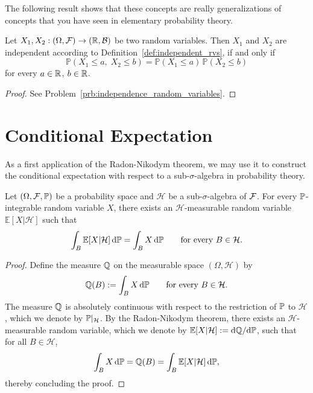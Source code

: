 The following result shows that these concepts are really generalizations of concepts that you have seen in elementary probability theory.

\begin{lemma}\label{lem:independence_random_variables}
Let $X_1, X_2: (\Omega, \mathcal F) \to (\mathbb R, \mathcal B)$ be two random variables. Then $X_1$ and $X_2$ are independent according to Definition~\ref{def:independent_rvs}, if and only if 
	\[
	\mathbb{P}( X_1 \leq a,\; X_2 \leq b ) = \mathbb{P}(X_1 \leq a)\, \mathbb{P}(X_2 \leq b)
	\]
	for every $a \in \mathbb R$, $b \in \mathbb R$.
\end{lemma}

\begin{proof}
See Problem~\ref{prb:independence_random_variables}.
\end{proof}

\section{Conditional Expectation}

As a first application of the Radon-Nikodym theorem, we may use it to construct the conditional expectation with respect to a sub-$\sigma$-algebra in probability theory.

\begin{theorem}
Let $(\Omega, \mathcal F, \mathbb P)$ be a probability space and $\mathcal{H}$ be a sub-$\sigma$-algebra of $\mathcal F$. For every $\mathbb P$-integrable random variable $X$, there exists an $\mathcal{H}$-measurable random variable $\mathbb{E}[X|\mathcal{H}]$ such that
\[
\int_B \mathbb{E}[ X | \mathcal{H} ] \,\mathrm{d} \mathbb P = \int_B X\, \mathrm{d} \mathbb P\qquad\text{for every $B \in \mathcal{H}$}.
\]
\end{theorem}

\begin{proof}
Define the measure $\mathbb Q$ on the measurable space $(\Omega,\mathcal{H})$ by
\[
\mathbb Q(B) := \int_B X\, \mathrm{d} \mathbb P \qquad \text{for every  $B \in \mathcal{H}$}.
\]
The measure $\mathbb Q$ is absolutely continuous with respect to the restriction of $\mathbb P$ to $\mathcal{H}$, which we denote by $\mathbb P|_{\mathcal{H}}$.
By the Radon-Nikodym theorem, there exists an $\mathcal{H}$-measurable random variable, which we denote by $\mathbb{E}[X|\mathcal{H}] := \mathrm{d}\mathbb Q/\mathrm{d}\mathbb P$, such that for all $B \in \mathcal{H}$,
\[
\int_B X \,\mathrm{d} \mathbb P = \mathbb Q(B) = \int_B \mathbb{E}[X | \mathcal{H}] \,\mathrm{d} \mathbb P,
\]
thereby concluding the proof.
\end{proof}

